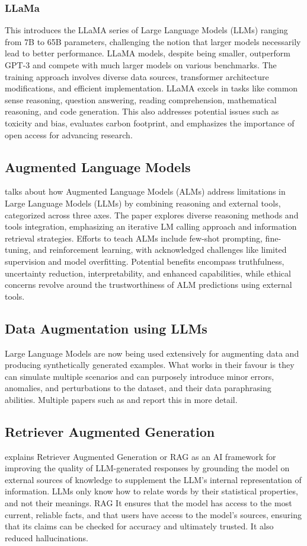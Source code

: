 \documentclass[10pt,twocolumn,letterpaper]{article}
\begin{document}
\subsubsection{LLaMa \cite{touvron2023llama}}
This introduces the LLaMA series of Large Language Models (LLMs) ranging from 7B to 65B parameters, challenging the notion that larger models necessarily lead to better performance. LLaMA models, despite being smaller, outperform GPT-3 and compete with much larger models on various benchmarks. The training approach involves diverse data sources, transformer architecture modifications, and efficient implementation. LLaMA excels in tasks like common sense reasoning, question answering, reading comprehension, mathematical reasoning, and code generation. This also addresses potential issues such as toxicity and bias, evaluates carbon footprint, and emphasizes the importance of open access for advancing research.
\subsection{Augmented Language Models}
\cite{Mialon2023AugmentedLM} talks about how Augmented Language Models (ALMs) address limitations in Large Language Models (LLMs) by combining reasoning and external tools, categorized across three axes. The paper explores diverse reasoning methods and tools integration, emphasizing an iterative LM calling approach and information retrieval strategies. Efforts to teach ALMs include few-shot prompting, fine-tuning, and reinforcement learning, with acknowledged challenges like limited supervision and model overfitting. Potential benefits encompass truthfulness, uncertainty reduction, interpretability, and enhanced capabilities, while ethical concerns revolve around the trustworthiness of ALM predictions using external tools.
\subsection{Data Augmentation using LLMs}
Large Language Models are now being used extensively for augmenting data and producing synthetically generated examples. What works in their favour is they can simulate multiple scenarios and can purposely introduce minor errors, anomalies, and perturbations to the dataset, and their data paraphrasing abilities. Multiple papers such as \cite{bonifacio2022inpars} and \cite{Li_2022} report this in more detail.
\subsection{Retriever Augmented Generation}
\cite{ibmWhatRetrievalaugmented} explains Retriever Augmented Generation or RAG as an AI framework for improving the quality of LLM-generated responses by grounding the model on external sources of knowledge to supplement the LLM’s internal representation of information. LLMs only know how to relate words by their statistical properties, and not their meanings. RAG  It ensures that the model has access to the most current, reliable facts, and that users have access to the model’s sources, ensuring that its claims can be checked for accuracy and ultimately trusted. It also reduced hallucinations.
\end{document}
